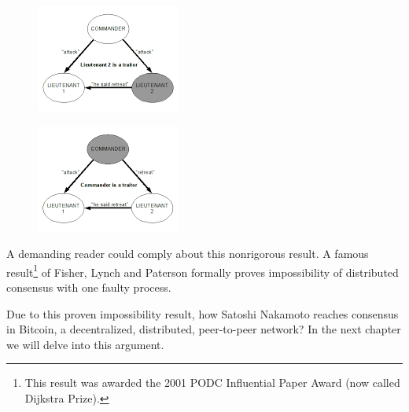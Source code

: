 \begin{figure}
\centering
\begin{minipage}{.5\textwidth}
  \centering
  \includegraphics[width=.8\linewidth]{Images/scenario1.png}
  \label{fig:scenario1}
\end{minipage}%
\begin{minipage}{.5\textwidth}
  \centering
  \includegraphics[width=.8\linewidth]{Images/scenario2.png}
  \label{fig:scenario2}
\end{minipage}
\end{figure}

\bigskip
\noindent
A demanding reader could comply about this nonrigorous result. A famous result\footnote{This result was awarded the 2001 PODC Influential Paper Award (now called Dijkstra Prize).} of Fisher, Lynch and Paterson \cite{Fischer:1985:IDC:3149.214121} formally proves impossibility of distributed consensus with one faulty process.

\bigskip
\noindent
Due to this proven impossibility result, how Satoshi Nakamoto reaches consensus in Bitcoin, a decentralized, distributed, peer-to-peer network? In the next chapter we will delve into this argument.